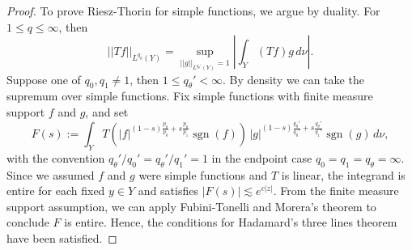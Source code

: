 \documentclass[reqno]{amsart}
\theoremstyle{definition}
\theoremstyle{remark}
\begin{document}
\begin{proof}
	To prove Riesz-Thorin for simple functions, we argue by duality. For $1 \leq q \leq \infty$, then
		\[ ||Tf||_{L^{q_\theta} (Y)} = \sup_{||g||_{L^{q_\theta'} (Y)} = 1} \left| \int_Y (Tf) g \, d\nu \right|. \]
	Suppose one of $q_0, q_1 \neq 1$, then $1 \leq q_\theta' < \infty$. By density we can take the supremum over simple functions. Fix simple functions with finite measure support $f$ and $g$, and set
		\[ F(s) := \int_Y T\left( |f|^{(1 - s)\frac{p_\theta}{p_0} + s \frac{p_\theta}{p_1}} \operatorname{sgn} (f) \right) \,  |g|^{(1 - s)\frac{q_\theta'}{q_0'} + s \frac{q_\theta'}{q_1'}} \operatorname{sgn} (g) \, d\nu, \]
	with the convention $q_\theta' /q_0' = q_\theta'/q_1' = 1$ in the endpoint case $q_0 = q_1 = q_\theta = \infty$. Since we assumed $f$ and $g$ were simple functions and $T$ is linear, the integrand is entire for each fixed $y \in Y$ and satisfies $|F(s)| \lesssim e^{c|z|}$. From the finite measure support assumption, we can apply Fubini-Tonelli and Morera's theorem to conclude $F$ is entire. Hence, the conditions for Hadamard's three lines theorem have been satisfied. 
	

\end{proof}
\end{document}
